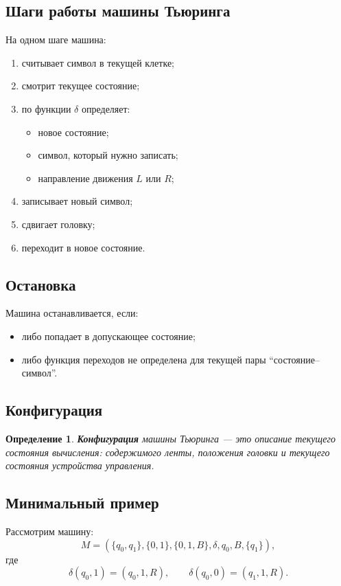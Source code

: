 \documentclass[12pt,a4paper]{article}
\newtheorem{definition}{Определение}
\begin{document}
\subsection{Шаги работы машины Тьюринга}
На одном шаге машина:
\begin{enumerate}
    \item считывает символ в текущей клетке;
    \item смотрит текущее состояние;
    \item по функции $\delta$ определяет:
    \begin{itemize}
        \item новое состояние;
        \item символ, который нужно записать;
        \item направление движения $L$ или $R$;
    \end{itemize}
    \item записывает новый символ;
    \item сдвигает головку;
    \item переходит в новое состояние.
\end{enumerate}

\subsection{Остановка}
Машина останавливается, если:
\begin{itemize}
    \item либо попадает в допускающее состояние;
    \item либо функция переходов не определена для текущей пары ``состояние--символ''.
\end{itemize}

\subsection{Конфигурация}
\begin{definition}
\textbf{Конфигурация} машины Тьюринга --- это описание текущего состояния вычисления: содержимого ленты, положения головки и текущего состояния устройства управления.
\end{definition}

\subsection{Минимальный пример}
Рассмотрим машину:
\[
M=(\{q_0,q_1\},\{0,1\},\{0,1,B\},\delta,q_0,B,\{q_1\}),
\]
где
\[
\delta(q_0,1)=(q_0,1,R),\qquad
\delta(q_0,0)=(q_1,1,R).
\]
\end{document}
